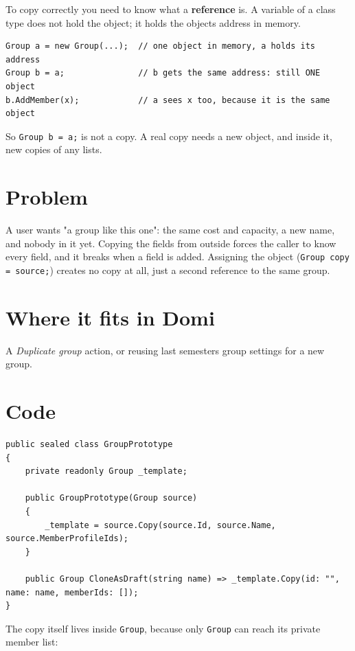 \documentclass{utmreport}
\providecommand{\passthrough}[1]{#1}
\begin{document}
To copy correctly you need to know what a \textbf{reference} is. A variable of a class type does not hold the object; it holds the object\textquotesingle s address in memory.

\begin{lstlisting}
Group a = new Group(...);  // one object in memory, a holds its address
Group b = a;               // b gets the same address: still ONE object
b.AddMember(x);            // a sees x too, because it is the same object
\end{lstlisting}

So \passthrough{\lstinline!Group b = a;!} is not a copy. A real copy needs a new object, and inside it, new copies of any lists.

\section{Problem}

A user wants "a group like this one": the same cost and capacity, a new name, and nobody in it yet. Copying the fields from outside forces the caller to know every field, and it breaks when a field is added. Assigning the object (\passthrough{\lstinline!Group copy = source;!}) creates no copy at all, just a second reference to the same group.

\section{Where it fits in Domi}

A \emph{Duplicate group} action, or reusing last semester\textquotesingle s group settings for a new group.

\section{Code}

\begin{lstlisting}
public sealed class GroupPrototype
{
    private readonly Group _template;

    public GroupPrototype(Group source)
    {
        _template = source.Copy(source.Id, source.Name, source.MemberProfileIds);
    }

    public Group CloneAsDraft(string name) => _template.Copy(id: "", name: name, memberIds: []);
}
\end{lstlisting}

The copy itself lives inside \passthrough{\lstinline!Group!}, because only \passthrough{\lstinline!Group!} can reach its private member list:
\end{document}
